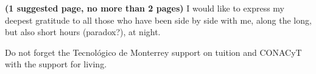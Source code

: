 \textbf{(1 suggested page,  no more than 2 pages)} I would like to express my deepest gratitude to all those who have been side by side with me, along the long, but also short hours (paradox?), at night.

Do not forget the Tecnol\'{o}gico de Monterrey support on tuition and CONACyT with the support for living.